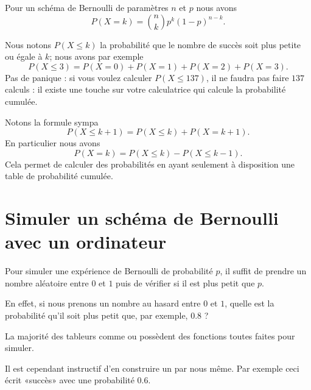 \begin{Aretenir}
    Pour un schéma de Bernoulli de paramètres \( n\) et \( p\) nous avons
    \begin{equation}
        P(X=k)={n\choose k}p^{k}(1-p)^{n-k}.
    \end{equation}
\end{Aretenir}

Nous notons \( P(X\leq k)\) la probabilité que le nombre de succès soit plus petite ou égale à \( k\); nous avons par exemple
\begin{equation}
    P(X\leq 3)=P(X=0)+P(X=1)+P(X=2)+P(X=3).
\end{equation}
Pas de panique : si vous voulez calculer \( P(X\leq 137)\), il ne faudra pas faire \( 137\) calculs : il existe une touche sur votre calculatrice qui calcule la probabilité cumulée.

Notons la formule sympa
\begin{equation}
    P(X\leq k+1)=P(X\leq k)+P(X=k+1).
\end{equation}
En particulier nous avons
\begin{equation}
    P(X=k)=P(X\leq k)-P(X\leq k-1).
\end{equation}
Cela permet de calculer des probabilités en ayant seulement à disposition une table de probabilité cumulée.

\section{Simuler un schéma de Bernoulli avec un ordinateur}

Pour simuler une expérience de Bernoulli de probabilité \( p\), il suffit de prendre un nombre aléatoire entre \( 0\) et \( 1\) puis de vérifier si il est plus petit que \( p\).

En effet, si nous prenons un nombre au hasard entre \( 0\) et \( 1\), quelle est la probabilité qu'il soit plus petit que, par exemple, \( 0.8\) ?

La majorité des tableurs comme  ou  possèdent des fonctions toutes faites pour simuler.

Il est cependant instructif d'en construire un par nous même. Par exemple ceci écrit «succès» avec une probabilité \( 0.6\).


